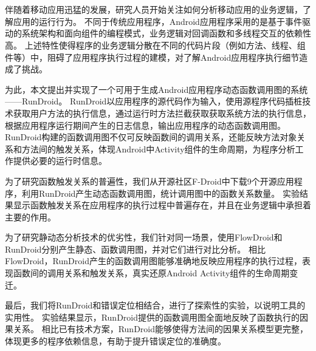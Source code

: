 
\chapter*{}


\setlength{\baselineskip}{25pt}	



伴随着移动应用迅猛的发展，研究人员开始关注如何分析移动应用的业务逻辑，了解应用的运行行为。
不同于传统应用程序，Android应用程序采用的是基于事件驱动的系统架构和面向组件的编程模式，业务逻辑对回调函数和多线程交互的依赖性高。
上述特性使得程序的业务逻辑分散在不同的代码片段（例如方法、线程、组件等）中，阻碍了应用程序执行过程的建模，对了解Android应用程序执行细节造成了挑战。



为此，本文提出并实现了一个可用于生成Android应用程序动态函数调用图的系统——RunDroid。
RunDroid以应用程序的源代码作为输入，使用源程序代码插桩技术获取用户方法的执行信息，通过运行时方法拦截获取获取系统方法的执行信息，根据应用程序运行期间产生的日志信息，输出应用程序的动态函数调用图。
RunDroid构建的函数调用图不仅可反映函数间的调用关系，还能反映方法对象关系和方法间的触发关系，体现Android中Activity组件的生命周期，为程序分析工作提供必要的运行时信息。




为了研究函数触发关系的普遍性，我们从开源社区F-Droid中下载9个开源应用程序，利用RunDroid产生动态函数调用图，统计调用图中的函数关系数量。
实验结果显示函数触发关系在应用程序的执行过程中普遍存在，并且在业务逻辑中承担着主要的作用。

为了研究静动态分析技术的优劣性，我们针对同一场景，使用FlowDroid和RunDroid分别产生静态、函数调用图，并对它们进行对比分析。
相比FlowDroid，RunDroid产生的函数调用图能够准确地反映应用程序的执行过程，表现函数间的调用关系和触发关系，真实还原Android Activity组件的生命周期变迁。

最后，我们将RunDroid和错误定位相结合，进行了探索性的实验，以说明工具的实用性。
实验结果显示，RunDroid提供的函数调用图全面地反映了函数执行的因果关系。
相比已有技术方案，RunDroid能够使得方法间的因果关系模型更完整，体现更多的程序依赖信息，有助于提升错误定位的准确度。


{}   %

